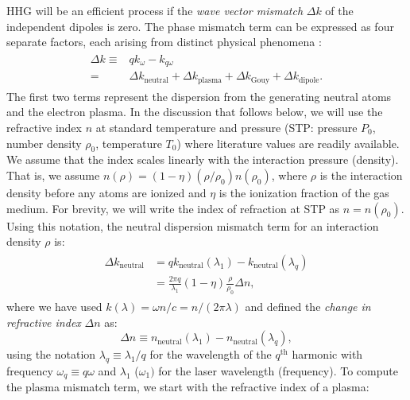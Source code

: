 HHG will be an efficient process if the \textit{wave vector mismatch} $\Delta k$ of the independent dipoles is zero. The phase mismatch term can be expressed as four separate factors, each arising from distinct physical phenomena \cite{rothhardtAbsorptionlimitedPhasematchedHigh2014}:
\begin{align}
\label{eqn:phase_mismatch}
\begin{split}
\Delta k \equiv & q k_{\omega} - k_{q \omega} \\
=& \Delta k_{\textrm{neutral}} + \Delta k_{\textrm{plasma}} + \Delta k_{\textrm{Gouy}} + \Delta k_{\textrm{dipole}}.
\end{split}
\end{align}
The first two terms represent the dispersion from the generating neutral atoms and the electron plasma. In the discussion that follows below, we will use the refractive index $n$ at standard temperature and pressure (STP: pressure $P_0$, number density $\rho_0$, temperature $T_0$) where literature values are readily available. We assume that the index scales linearly with the interaction pressure (density). That is, we assume $n(\rho) = (1-\eta)(\rho / \rho_0) n(\rho_0)$, where $\rho$ is the interaction density before any atoms are ionized and $\eta$ is the ionization fraction of the gas medium. For brevity, we will write the index of refraction at STP as $n = n(\rho_0)$. Using this notation, the neutral dispersion mismatch term for an interaction density $\rho$ is:
\begin{align}
\begin{split}
\Delta k_{\textrm{neutral}} &= q k_{\textrm{neutral}}(\lambda_1) - k_{\textrm{neutral}}(\lambda_{q}) \\
&= \frac{2 \pi q}{\lambda_1} (1-\eta) \frac{\rho}{\rho_0}\Delta n,
\label{eqn:deltak_neutral}
\end{split}
\end{align}
where we have used $k(\lambda)= \omega n /c = n / (2 \pi \lambda)$ and defined the \textit{change in refractive index} $\Delta n$ as:
\begin{equation}
\Delta n \equiv n_{\textrm{neutral}}(\lambda_1) - n_{\textrm{neutral}}(\lambda_q),
\label{eqn:refractive_index_mismatch}
\end{equation}
using the notation $\lambda_q \equiv \lambda_1 / q$ for the wavelength of the $q^{\textrm{th}}$ harmonic with frequency $\omega_q \equiv q \omega$ and $\lambda_1$ ($\omega_1)$ for the laser wavelength (frequency). To compute the plasma mismatch term, we start with the refractive index of a plasma:
